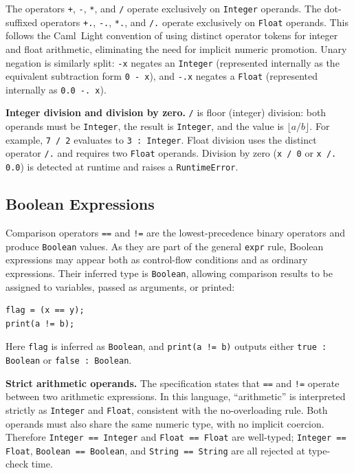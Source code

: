 The operators \texttt{+}, \texttt{-}, \texttt{*}, and \texttt{/} operate
exclusively on \texttt{Integer} operands. The dot-suffixed operators
\texttt{+.}, \texttt{-.}, \texttt{*.}, and \texttt{/.} operate exclusively on
\texttt{Float} operands. This follows the Caml~Light convention of using
distinct operator tokens for integer and float arithmetic, eliminating the need
for implicit numeric promotion. Unary negation is similarly split:
\texttt{-x} negates an \texttt{Integer} (represented internally as the
equivalent subtraction form \texttt{0 - x}), and
\texttt{-.x} negates a \texttt{Float} (represented internally as
\texttt{0.0 -. x}).

\textbf{Integer division and division by zero.}
\texttt{/} is floor (integer) division: both operands must be \texttt{Integer},
the result is \texttt{Integer}, and the value is $\lfloor a / b \rfloor$.
For example, \texttt{7 / 2} evaluates to \texttt{3 : Integer}.
Float division uses the distinct operator \texttt{/.} and requires two
\texttt{Float} operands.
Division by zero (\texttt{x / 0} or \texttt{x /. 0.0}) is detected at runtime
and raises a \texttt{RuntimeError}.

\subsection{Boolean Expressions}
Comparison operators \texttt{==} and \texttt{!=} are the lowest-precedence
binary operators and produce \texttt{Boolean} values. As they are part
of the general \texttt{expr} rule, Boolean expressions may appear both as
control-flow conditions and as ordinary expressions. Their inferred type is
\texttt{Boolean}, allowing comparison results to be assigned to variables,
passed as arguments, or printed:

\begin{lstlisting}
flag = (x == y);
print(a != b);
\end{lstlisting}

\noindent Here \texttt{flag} is inferred as \texttt{Boolean}, and
\texttt{print(a != b)} outputs either \texttt{true : Boolean} or
\texttt{false : Boolean}.

\textbf{Strict arithmetic operands.}
The specification states that \texttt{==} and \texttt{!=} operate between two
arithmetic expressions. In this language, ``arithmetic'' is interpreted
strictly as \texttt{Integer} and \texttt{Float}, consistent with the
no-overloading rule. Both operands must also share the same numeric type, with
no implicit coercion. Therefore
\texttt{Integer == Integer} and \texttt{Float == Float} are well-typed;
\texttt{Integer == Float}, \texttt{Boolean == Boolean}, and
\texttt{String == String} are all rejected at type-check time.

